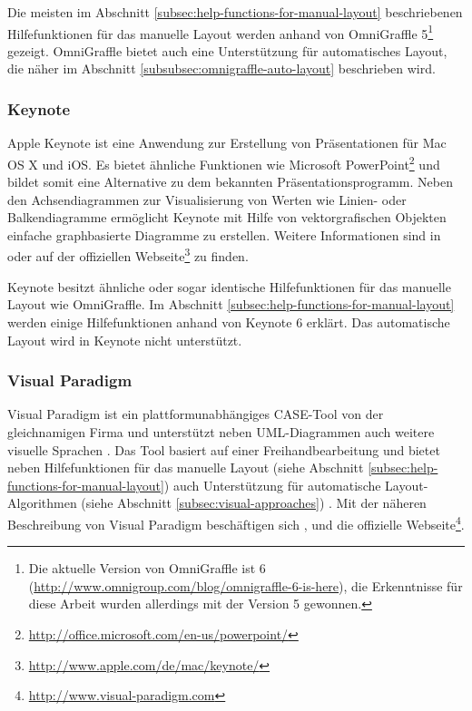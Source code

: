 Die meisten im Abschnitt \ref{subsec:help-functions-for-manual-layout} beschriebenen Hilfefunktionen für das manuelle Layout werden anhand von OmniGraffle 5\footnote{Die aktuelle Version von OmniGraffle ist 6 (\url{http://www.omnigroup.com/blog/omnigraffle-6-is-here}), die Erkenntnisse für diese Arbeit wurden allerdings mit der Version 5 gewonnen.} gezeigt. OmniGraffle bietet auch eine Unterstützung für automatisches Layout, die näher im Abschnitt \ref{subsubsec:omnigraffle-auto-layout} beschrieben wird.

\subsubsection{Keynote}
\label{subsubsec:keynote}

Apple Keynote ist eine Anwendung zur Erstellung von Präsentationen für Mac OS X und iOS. Es bietet ähnliche Funktionen wie Microsoft PowerPoint\footnote{\url{http://office.microsoft.com/en-us/powerpoint/}} und bildet somit eine Alternative zu dem bekannten Präsentationsprogramm. Neben den Achsendiagrammen zur Visualisierung von Werten wie Linien- oder Balkendiagramme ermöglicht Keynote mit Hilfe von vektorgrafischen Objekten einfache graphbasierte Diagramme zu erstellen. Weitere Informationen sind in \cite{11Keynote} oder auf der offiziellen Webseite\footnote{\url{http://www.apple.com/de/mac/keynote/}} zu finden. 

Keynote besitzt ähnliche oder sogar identische Hilfefunktionen für das manuelle Layout wie OmniGraffle. Im Abschnitt \ref{subsec:help-functions-for-manual-layout} werden einige Hilfefunktionen anhand von Keynote 6 erklärt. Das automatische Layout wird in Keynote nicht unterstützt.

\subsubsection{Visual Paradigm}
\label{subsubsec:visual-paradigm}

Visual Paradigm ist ein plattformunabhängiges CASE-Tool von der gleichnamigen Firma und unterstützt neben UML-Diagrammen auch weitere visuelle Sprachen \cite{14Visual}. Das Tool basiert auf einer Freihandbearbeitung und bietet neben Hilfefunktionen für das manuelle Layout (siehe Abschnitt \ref{subsec:help-functions-for-manual-layout}) auch Unterstützung für automatische Layout-Algorithmen (siehe Abschnitt \ref{subsec:visual-approaches}) \cite{Fuhrmann11On-the-Pragmatics}. Mit der näheren Beschreibung von Visual Paradigm beschäftigen sich \cite{14Visual}, \cite[S.313-314]{Fuhrmann11On-the-Pragmatics} und die offizielle Webseite\footnote{\url{http://www.visual-paradigm.com}}.

